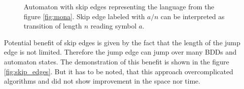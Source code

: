 \documentclass[pdflatex,sn-mathphys-num]{sn-jnl}%
\theoremstyle{thmstyleone}%
\theoremstyle{thmstyletwo}%
\theoremstyle{thmstylethree}%
\begin{document}
        \vspace*{-1em}

        \begin{figure}[H]
            \centering
            \caption{Automaton with skip edges representing the language from the figure \ref{fig:mona}. Skip edge labeled with $a/n$ can be interpreted as transition of length $n$ reading symbol $a$.}
        \end{figure}

        \vspace*{-1.5em}

        Potential benefit of skip edges is given by the fact that the length of the jump edge is not limited. Therefore the jump edge can jump over many BDDs and automaton states. The demonstration of this benefit is shown in the figure \ref{fig:skip_edges}. But it has to be noted, that this approach overcomplicated algorithms and did not show improvement in the space nor time.

        \vspace*{-1.25em}
\end{document}
